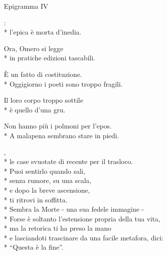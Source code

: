 \documentclass[12pt]{book}
\begin{document}
\begin{poem}{Epigramma IV}{}

\settowidth{\versewidth}{non meno è ciò che meriti.}

\begin{altverse}
:\\*
l'epica è morta d'inedia.
\end{altverse}

\begin{altverse}
Ora, Omero si legge \\*
in pratiche edizioni tascabili.
\end{altverse}

\begin{altverse}
È un fatto di costituzione. \\*
Oggigiorno i poeti sono troppo fragili.
\end{altverse}

\begin{altverse}
Il loro corpo troppo sottile \\*
è quello d'una gru.
\end{altverse}

\begin{altverse}
Non hanno più i polmoni per l'epos. \\*
A malapena sembrano stare in piedi.
\end{altverse}

\end{poem}

\begin{poem}{}{}

\settowidth{\versewidth}{non meno è ciò che meriti.}

\begin{changemargin}{-1cm}{-3cm} 

\begin{altverse}
\quad \qquad {},\\*
le case svuotate di recente per il trasloco.\\*
Puoi sentirlo quando sali, \\*
senza rumore, su una scala, \\*
e dopo la breve ascensione, \\*
ti ritrovi in soffitta. \\*
Sembra la Morte - una sua fedele immagine -\\*
Forse è soltanto l’estensione propria della tua vita, \\*
ma la retorica ti ha preso la mano \\*
e lasciandoti trascinare da una facile metafora, dici: \\*
“Questa è la fine”.
\end{altverse}


\end{changemargin}


\end{poem}
\end{document}
